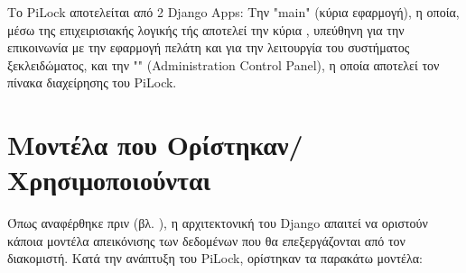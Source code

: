 	Το PiLock αποτελείται από 2 Django Apps: Την "main" (κύρια εφαρμογή), η οποία, μέσω της επιχειρισιακής λογικής τής αποτελεί την κύρια \textbf{}, υπεύθηνη για την επικοινωνία με την εφαρμογή πελάτη και για την λειτουργία του συστήματος ξεκλειδώματος, και την "" (Administration Control Panel), η οποία αποτελεί τον πίνακα διαχείρησης του PiLock.

\section{Μοντέλα που Ορίστηκαν/Χρησιμοποιούνται}
	\label{sec:models}
	Όπως αναφέρθηκε πριν (βλ. ), η αρχιτεκτονική του Django απαιτεί να οριστούν κάποια μοντέλα απεικόνισης των δεδομένων που θα επεξεργάζονται από τον διακομιστή. Κατά την ανάπτυξη του PiLock, ορίστηκαν τα παρακάτω μοντέλα:

